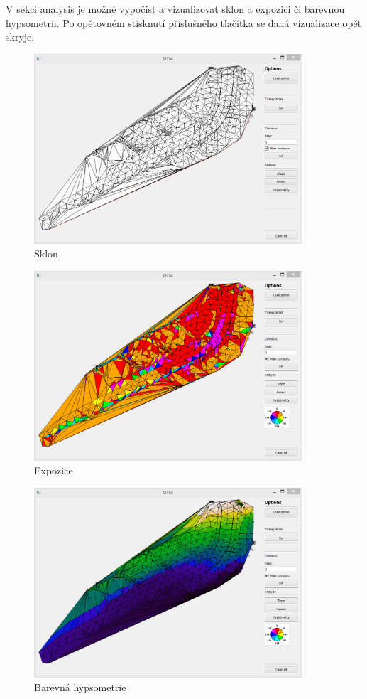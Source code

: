 \documentclass[a4paper, 12pt]{article}
\begin{document}
V sekci analysis je možné vypočíst a vizualizovat sklon a expozici či barevnou hypsometrii. Po opětovném stisknutí příslušného tlačítka se daná vizualizace opět skryje.
\begin{figure}[h]
	\centering
	\includegraphics[width=10cm]{sklon.jpg}
	\caption{Sklon}
\end{figure}

\clearpage

\begin{figure}[h]
	\centering
	\includegraphics[width=10cm]{aspect.jpg}
	\caption{Expozice}
\end{figure}

\begin{figure}[h]
	\centering
	\includegraphics[width=10cm]{hypsometrie.jpg}
	\caption{Barevná hypsometrie}
\end{figure}
\end{document}
